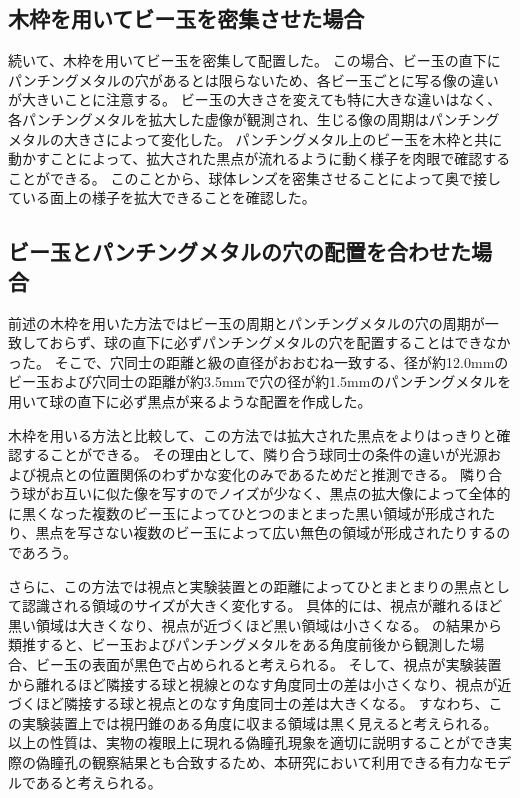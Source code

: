 \subsection{木枠を用いてビー玉を密集させた場合}
\label{SSWoodframe}
続いて、木枠を用いてビー玉を密集して配置した\figref{}。
この場合、ビー玉の直下にパンチングメタルの穴があるとは限らないため、各ビー玉ごとに写る像の違いが大きいことに注意する。
ビー玉の大きさを変えても特に大きな違いはなく、各パンチングメタルを拡大した虚像が観測され、生じる像の周期はパンチングメタルの大きさによって変化した\figref{}。
パンチングメタル上のビー玉を木枠と共に動かすことによって、拡大された黒点が流れるように動く様子を肉眼で確認することができる。
このことから、球体レンズを密集させることによって奥で接している面上の様子を拡大できることを確認した。

\subsection{ビー玉とパンチングメタルの穴の配置を合わせた場合}
\label{SSMarbleonhole}
前述の木枠を用いた方法ではビー玉の周期とパンチングメタルの穴の周期が一致しておらず、球の直下に必ずパンチングメタルの穴を配置することはできなかった。
そこで、穴同士の距離と級の直径がおおむね一致する、径が約12.0mmのビー玉および穴同士の距離が約3.5mmで穴の径が約1.5mmのパンチングメタルを用いて球の直下に必ず黒点が来るような配置を作成した\figref{}。

木枠を用いる方法と比較して、この方法では拡大された黒点をよりはっきりと確認することができる。
その理由として、隣り合う球同士の条件の違いが光源および視点との位置関係のわずかな変化のみであるためだと推測できる。
隣り合う球がお互いに似た像を写すのでノイズが少なく、黒点の拡大像によって全体的に黒くなった複数のビー玉によってひとつのまとまった黒い領域が形成されたり、黒点を写さない複数のビー玉によって広い無色の領域が形成されたりするのであろう\figref{}。

さらに、この方法では視点と実験装置との距離によってひとまとまりの黒点として認識される領域のサイズが大きく変化する。
具体的には、視点が離れるほど黒い領域は大きくなり、視点が近づくほど黒い領域は小さくなる。
の結果から類推すると、ビー玉およびパンチングメタルをある角度前後から観測した場合、ビー玉の表面が黒色で占められると考えられる。
そして、視点が実験装置から離れるほど隣接する球と視線とのなす角度同士の差は小さくなり、視点が近づくほど隣接する球と視点とのなす角度同士の差は大きくなる\figref{}。
すなわち、この実験装置上では視円錐のある角度に収まる領域は黒く見えると考えられる\figref{}。
以上の性質は、実物の複眼上に現れる偽瞳孔現象を適切に説明することができ実際の偽瞳孔の観察結果とも合致するため、本研究において利用できる有力なモデルであると考えられる。

